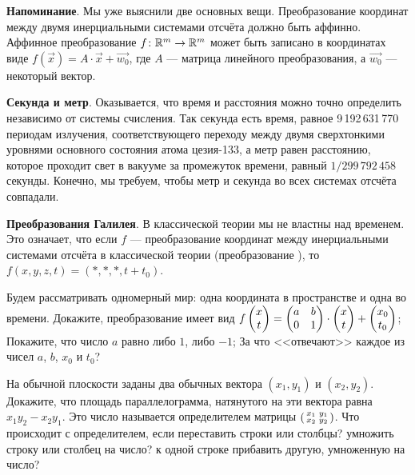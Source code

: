 \documentclass[a4paper,11pt]{article}
\newcommand{\smat}[1]{\hr{\begin{smallmatrix}#1\end{smallmatrix}}}
\newcommand{\мв}{\,м$_в$}
\begin{document}

{\footnotesize
\noindent\textbf{Напоминание}.
Мы уже выяснили две основных вещи.
Преобразование координат между двумя инерциальными системами отсчёта должно быть аффинно.
Аффинное преобразование $f\colon\mathbb{R}^m\rightarrow\mathbb{R}^m$ может быть записано в координатах виде $f(\vec{x}) = A\cdot \vec{x} + \vec{w_0}$,
где $A$ --- матрица линейного преобразования, а $\vec{w_0}$ --- некоторый вектор.

\noindent\textbf{Секунда и метр}.
Оказывается, что время и расстояния можно точно определить независимо от системы счисления.
Так секунда есть время, равное 9\,192\,631\,770 периодам излучения, соответствующего переходу между двумя сверхтонкими уровнями основного состояния атома цезия-133, а метр равен расстоянию, которое проходит свет в вакууме за промежуток времени, равный $1/299\,792\,458$ секунды.
Конечно, мы требуем, чтобы метр и секунда во всех системах отсчёта совпадали.

\noindent\textbf{Преобразования Галилея}.
В классической теории мы не властны над временем.
Это означает, что если $f$ --- преобразование координат между инерциальными системами отсчёта в классической теории (преобразование ), то $f(x,y,z,t) = (*,*,*,t+t_0)$.
\par}


Будем рассматривать одномерный мир: одна координата в пространстве и одна во времени.
Докажите, преобразование имеет вид $f\begin{pmatrix}x\\t\end{pmatrix} = \begin{pmatrix}a&b\\0&1\end{pmatrix}\cdot\begin{pmatrix}x\\t\end{pmatrix}+\begin{pmatrix}x_0\\t_0\end{pmatrix}$;
Покажите, что число $a$ равно либо $1$, либо $-1$;
За что <<отвечают>> каждое из чисел $a$, $b$, $x_0$ и $t_0$?


На обычной плоскости заданы два обычных вектора $(x_1,y_1)$ и $(x_2,y_2)$. Докажите, что площадь параллелограмма, натянутого на эти вектора равна $x_1y_2-x_2y_1$. Это число называется  определителем матрицы $\smat{x_1&y_1\\x_2&y_2}$.
Что происходит с определителем, если
переставить строки или столбцы?
умножить строку или столбец на число?
к одной строке прибавить другую, умноженную на число?

%
\end{document}
